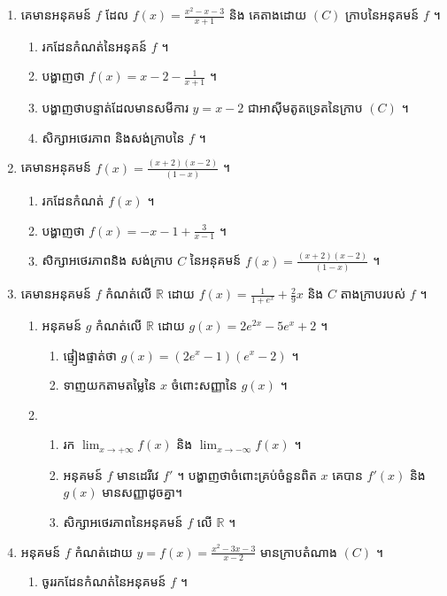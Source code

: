 \documentclass[12pt, a4paper]{article}
\begin{document}
\begin{enumerate}[m]
\begin{enumerate}[k]
	\end{enumerate}
	\item គេមានអនុគមន៍ $f$ ដែល $f(x)=\frac{x^2-x-3}{x+1}$  និង គេតាងដោយ $(C)$  ក្រាបនៃអនុគមន៍ $f$ ។
	\begin{enumerate}[k]
		\item រកដែនកំណត់នៃអនុគន៍ $f$ ។
		\item បង្ហាញថា  $f(x)=x-2-\frac{1}{x+1}$ ។
		\item បង្ហាញថាបន្ទាត់ដែលមានសមីការ  $y=x-2$ ជាអាស៊ីមតូតទ្រេតនៃក្រាប $(C)$ ។
		\item សិក្សាអថេរភាព និងសង់ក្រាបនៃ $f$ ។
	\end{enumerate}
	\item គេមានអនុគមន៍ $f(x)=\frac{(x+2)(x-2)}{(1-x)}$ ។
	\begin{enumerate}[k]
		\item រកដែនកំណត់ $f(x)$ ។
		\item បង្ហាញថា $f(x)=-x-1+\frac{3}{x-1}$ ។
		\item សិក្សាអថេរភាពនិង សង់ក្រាប $C$ នៃអនុគមន៍ $f(x)=\frac{(x+2)(x-2)}{(1-x)}$ ។
	\end{enumerate}
	\item គេមានអនុគមន៍ $f$ កំណត់លើ $\mathbb{R}$ ដោយ $f(x)=\frac{1}{1+e^x}+\frac{2}{9}x$ និង $C$ តាងក្រាបរបស់ $f$ ។
	\begin{enumerate}[1]
		\item អនុគមន៍ $g$ កំណត់លើ $\mathbb{R}$ ដោយ $g(x)=2e^{2x}-5e^x+2$ ។
		\begin{enumerate}[k]
			\item ផ្ទៀងផ្ទាត់ថា $g(x)=\left(2e^x-1\right)\left(e^x-2\right)$ ។
			\item ទាញយកតាមតម្លៃនៃ $x$ ចំពោះសញ្ញានៃ $g(x)$ ។
		\end{enumerate}
		\item 
		\begin{enumerate}[k]
			\item រក $\lim_{x\to +\infty}f(x)$ និង $\lim_{x\to -\infty}f(x)$ ។
			\item អនុគមន៍ $f$ មានដេរីវេ $f'$ ។
			បង្ហាញថាចំពោះគ្រប់ចំនួនពិត $x$ គេបាន $f'(x)$ និង $g(x)$ មានសញ្ញាដូចគ្នា។
			\item សិក្សាអថេរភាពនៃអនុគមន៍ $f$ លើ $\mathbb{R}$ ។
		\end{enumerate}
	\end{enumerate}
	\item អនុគមន៍ $f$ កំណត់ដោយ $y=f(x)=\frac{x^2-3x-3}{x-2}$ មានក្រាបតំណាង $(C)$ ។
	\begin{enumerate}[k]
		\item ចូររកដែនកំណត់នៃអនុគមន៍ $f$ ។

\end{enumerate}
\end{enumerate}
\end{document}
